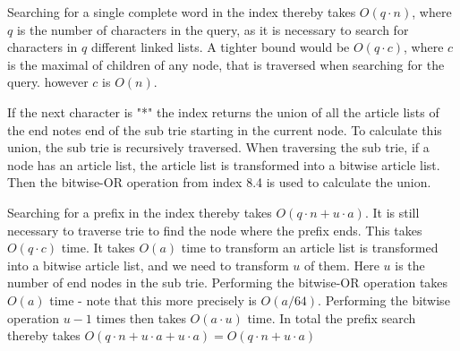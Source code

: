 Searching for a single complete word in the index thereby takes $O(q\cdot n)$, where $q$ is the number of characters in the query, as it is necessary to search for characters in $q$ different linked lists. A tighter bound would be $O(q\cdot c)$, where $c$ is the maximal of children of any node, that is traversed when searching for the query. however $c$ is $O(n)$. 

If the next character is "*" the index returns the union of all the article lists of the end notes end of the sub trie starting in the current node. To calculate this union, the sub trie is recursively traversed. When traversing the sub trie, if a node has an article list, the article list is transformed into a bitwise article list. Then the bitwise-OR operation from index 8.4 is used to calculate the union.

Searching for a prefix in the index thereby takes $O(q\cdot n + u\cdot a)$. It is still necessary to traverse trie to find the node where the prefix ends. This takes $O(q\cdot c)$ time. It takes $O(a)$ time to transform an article list is transformed into a bitwise article list, and we need to transform $u$ of them. Here $u$ is the number of end nodes in the sub trie. Performing the bitwise-OR operation takes $O(a)$ time - note that this more precisely is $O(a/64)$. Performing the bitwise operation $u-1$ times then takes $O(a \cdot u)$ time. In total the prefix search thereby takes $O(q\cdot n + u\cdot a + u\cdot a) = O(q\cdot n + u\cdot a)$
